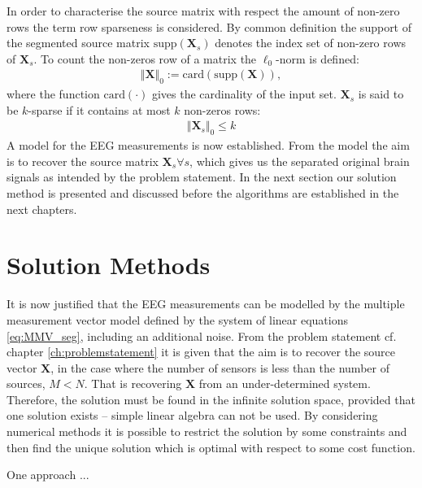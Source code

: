 In order to characterise the source matrix with respect the amount of non-zero rows the term row sparseness is considered.  
By common definition the support of the segmented source matrix $\text{supp}(\mathbf{X}_s)$ denotes the index set of non-zero rows of $\mathbf{X}_s$.
To count the non-zeros row of a matrix the $\ell_0$-norm is defined:
\begin{align*}
\Vert \mathbf{X} \Vert_0 := \text{card}(\text{supp}(\mathbf{X})),
\end{align*}
where the function $\text{card}(\cdot)$ gives the cardinality of the input set. 
$\textbf{X}_s$ is said to be $k$-sparse if it contains at most $k$ non-zeros rows:
\begin{align*}
\Vert \mathbf{X}_s \Vert_0 \leq k
\end{align*}
A model for the EEG measurements is now established.
From the model the aim is to recover the source matrix $\textbf{X}_s \forall s$, which gives us the separated original brain signals as intended by the problem statement.      
In the next section our solution method is presented and discussed before the algorithms are established in the next chapters.    

\section{Solution Methods}\label{sec:sol_met}
It is now justified that the EEG measurements can be modelled by the multiple measurement vector model defined by the system of linear equations \eqref{eq:MMV_seg}, including an additional noise.
From the problem statement cf. chapter \ref{ch:problemstatement} it is given that the aim is to recover the source vector $\textbf{X}$, in the case where the number of sensors is less than the number of sources, $M < N$. That is recovering $\textbf{X}$ from an under-determined system. Therefore, the solution must be found in the infinite solution space, provided that one solution exists -- simple linear algebra can not be used. 
By considering numerical methods it is possible to restrict the solution by some constraints and then find the unique solution which is optimal with respect to some cost function.

One approach ...





